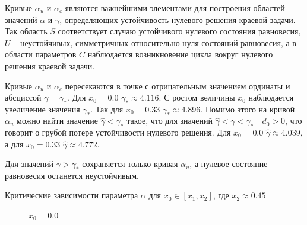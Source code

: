 \documentclass[12pt]{article}
\begin{document}
Кривые $ \alpha_u $ и $ \alpha_c $ являются важнейшими элементами для построения областей значений $ \alpha $ и $ \gamma $, определяющих устойчивость нулевого решения краевой задачи. Так область $ S $ соответствует случаю устойчивого нулевого состояния равновесия, $ U $ -- неустойчивых, симметричных относительно нуля состояний равновесия, а в области параметров $ C $ наблюдается возникновение цикла вокруг нулевого решения краевой задачи.

Кривые $ \alpha_u $ и $ \alpha_c $ пересекаются в точке с отрицательным значением ординаты и абсциссой $ \gamma = \gamma_* $. Для $ x_0 = 0.0 $ $ \gamma_* \approx 4.116 $. С ростом величины $ x_0 $ наблюдается увеличение значения $ \gamma_* $. Так для $ x_0 = 0.33 $ $ \gamma_* \approx 4.896 $. Помимо этого на кривой $ \alpha_u $ можно найти значение $ \hat{\gamma} < \gamma_* $ такое, что для значений $ \hat{\gamma} < \gamma < \gamma_*  \quad d_0 > 0 $, что говорит о грубой потере устойчивости нулевого решения. Для $ x_0 = 0.0 $ $ \hat{\gamma} \approx 4.039 $, а для $ x_0 = 0.33 $ $ \hat{\gamma} \approx 4.772 $.

Для значений $ \gamma > \gamma_* $ сохраняется только кривая $ \alpha_u $, а нулевое состояние равновесия останется неустойчивым.

\newpage

\begin{center}
Критические зависимости параметра $ \alpha $ для $ x_0 \in [x_1, x_2] $, где $ x_2 \approx 0.45 $
\end{center}

\begin{figure}[h]
\begin{minipage}[h]{0.99\linewidth}
\caption{$ x_0 = 0.0 $}
\end{minipage}
\end{figure}
\end{document}
